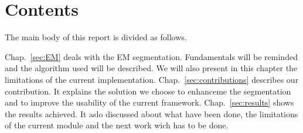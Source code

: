 \section{Contents}\label{intro:contents}
The main body of this report is divided as follows.
\par
Chap.~\ref{sec:EM} deals with the EM segmentation. Fundamentals will be reminded and the algorithm used will be described. We will also present in this chapter the limitations of the current implementation.
Chap.~\ref{sec:contributions} describes our contribution. It explains the solution we choose to enhanceme the segmentation and to improve the usability of the current framework.
Chap.~\ref{sec:results} shows the results achieved. It aslo discussed about what have been done, the limitations of the current module and the next work wich has to be done.
%
